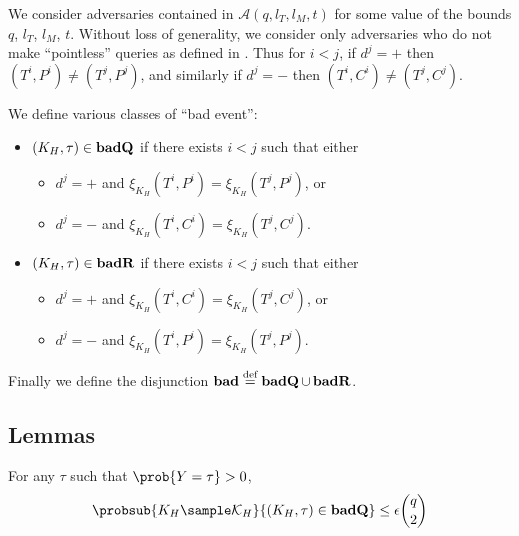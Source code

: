 \documentclass[eprint.tex]{subfiles}
\begin{document}
We consider adversaries contained in $\mathcal{A}(q, l_T, l_M, t)$ for some value of
the bounds $q$, $l_T$, $l_M$, $t$.
Without loss of generality, we consider only adversaries who do not make ``pointless''
queries as defined in \cite{cmc}. Thus for $i < j$, if $d^j = +$ then
$(T^i, P^i) \neq (T^j, P^j)$, and similarly if $d^j = -$ then
$(T^i, C^i) \neq (T^j, C^j)$.

We define various classes of ``bad event'':

\begin{itemize}
    \item $(K_H, \tau) \in \operatorname{\mathbf{badQ}}$ if there exists $i < j$ such that either
    \begin{itemize}
        \item $d^j = +$ and $\xi_{K_H}(T^i, P^i) = \xi_{K_H}(T^j, P^j)$, or
        \item $d^j = -$ and $\xi_{K_H}(T^i, C^i) = \xi_{K_H}(T^j, C^j)$.
    \end{itemize}
    \item $(K_H, \tau) \in \operatorname{\mathbf{badR}}$ if there exists $i < j$ such that either
    \begin{itemize}
        \item $d^j = +$ and $\xi_{K_H}(T^i, C^i) = \xi_{K_H}(T^j, C^j)$, or
        \item $d^j = -$ and $\xi_{K_H}(T^i, P^i) = \xi_{K_H}(T^j, P^j)$.
    \end{itemize}
\end{itemize}

Finally we define the disjunction
$\operatorname{\mathbf{bad}} \stackrel{\text{def}}{=} \operatorname{\mathbf{badQ}} \cup \operatorname{\mathbf{badR}}$.

\subsection{Lemmas}
\begin{lemma} \label{badQ}
    For any $\tau$ such that $\prob{Y = \tau} > 0$,
    \begin{displaymath}
        \probsub{K_H \sample \mathcal{K}_H}{(K_H, \tau) \in \badQ}
        \leq \epsilon \binom{q}{2}
    \end{displaymath}
\end{lemma}
\end{document}
